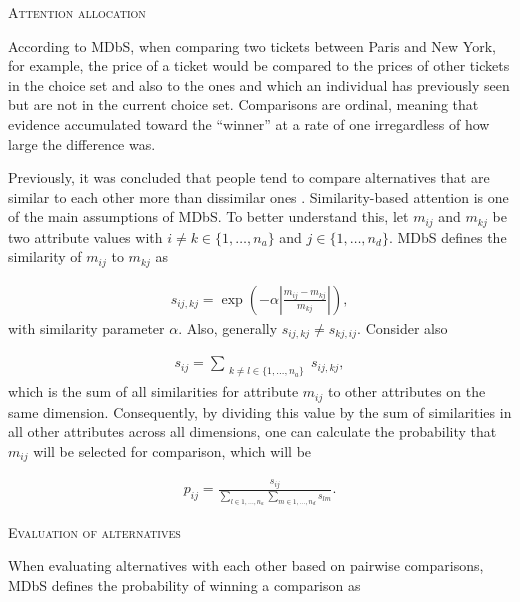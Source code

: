 \documentclass[a4paper,12pt]{article}
\begin{document}
\textsc{Attention allocation}

According to MDbS, when comparing two tickets between Paris and New York, for example, the price of a ticket would be compared to the prices of other tickets in the choice set and also to the ones and which an individual has previously seen but are not in the current choice set. Comparisons are ordinal, meaning that evidence accumulated toward the ``winner'' at a rate of one irregardless of how large the difference was. 

Previously, it was concluded that people tend to compare alternatives that are similar to each other more than dissimilar ones \citep{noguchi2014attraction}. Similarity-based attention is one of the main assumptions of MDbS. To better understand this, let $m_{ij}$ and $m_{kj}$ be two attribute values with $i \neq k \in \{1, \ldots, n_a\}$ and $j \in \{1, \ldots, n_d\}$. MDbS defines the similarity of $m_{ij}$ to $m_{kj}$ as

\begin{align}\label{similarityMDBS}
s_{ij,kj} = \exp \left( - \alpha \left| \frac{m_{ij} - m_{kj}}{m_{kj}} \right| \right) ,
\end{align}
with similarity parameter $\alpha$. Also, generally $s_{ij,kj} \neq s_{kj,ij}.$ Consider also 

\begin{align}\label{sumOfSimilaritiesMDbS}
    s_{ij} = \sum_{\substack{k \neq l \in \{1, \ldots, n_a\}}} s_{ij,kj}  ,
\end{align}
which is the sum of all similarities for attribute $m_{ij}$ to other attributes on the same dimension. Consequently, by dividing this value by the sum of similarities in all other attributes across all dimensions, one can calculate the probability that $m_{ij}$ will be selected for comparison, which will be 

\begin{align}\label{probabilityOfComparison}
    p_{ij} = \frac{s_{ij}}{\sum_{l \in {1, \ldots, n_a}} \sum_{m \in {1, \ldots, n_d}} s_{lm}} .
\end{align}

\textsc{Evaluation of alternatives}

When evaluating alternatives with each other based on pairwise comparisons, MDbS defines the probability of winning a comparison as 
\end{document}
